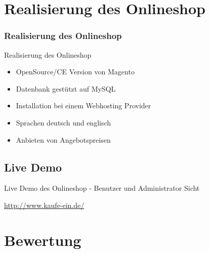 \documentclass[xcolor=dvipsnames]{beamer}
\begin{document}
\section{Realisierung des Onlineshop}
\begin{frame} %
  \frametitle{Realisierung des Onlineshop} %
  \begin{block}{Realisierung des Onlineshop}
	  \begin{itemize}
		\item OpenSource/CE Version von Magento
		\item Datenbank gestützt auf MySQL
		\item Installation bei einem Webhosting Provider
		\item Sprachen deutsch und englisch
		\item Anbieten von Angebotspreisen
	  \end{itemize}
  \end{block}
\end{frame}

\subsection{Live Demo}
\begin{frame} %
  \begin{exampleblock}{Live Demo des Onlineshop - Benutzer und Administrator Sicht}
	\begin{center}
		\vspace{1 cm}
		\url{http://www.kaufe-ein.de/}
		\vspace{1 cm}
	\end{center}
  \end{exampleblock}
\end{frame}

\section{Bewertung}
\begin{frame} %
\end{frame}
\end{document}
